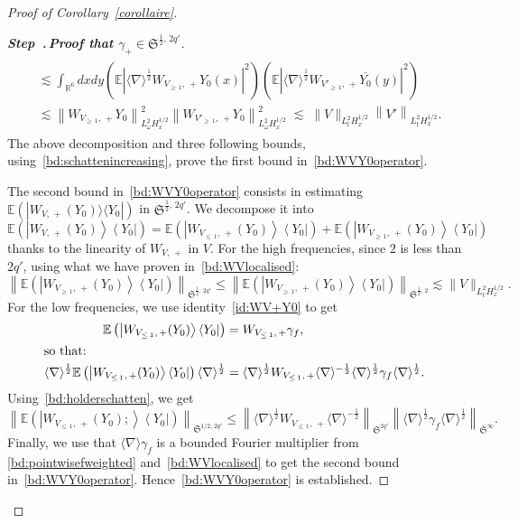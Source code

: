 \documentclass[10pt]{amsart}
\theoremstyle{definition}\newtheorem{defi}[theo]{Definition}\newtheorem{rema}[theo]{Remark}\newtheorem{exam}[theo]{Example}\newtheorem{exem}[theo]{Example}\newtheorem{nota}[theo]{Notation}
\newcommand{\R}{\mathbb{R}}
\newcommand{\E}{\mathbb{E}}
\newcommand{\frkS}{\mathfrak{S}}
\newcommand{\an}[1]{\langle #1 \rangle}
\newcounter{stepcount}
\newenvironment{step}[1]{\refstepcounter{stepcount}\begin{proof}[{\bf{Step~\thestepcount}{.\,\emph{#1}}}]}{\let\qed\relax\end{proof}}
\begin{document}
\begin{proof}[Proof of Corollary~\ref{corollaire}]
\begin{step}{{Proof that $\gamma_+\in \frkS^{\frac 12,\,2q'}$}}
\begin{multline*}
\begin{aligned}
&\lesssim \int_{\R^6}dxdy \left(\E \left|\langle \nabla \rangle^{\frac 12}W_{V_{\geq\,1},\,+}Y_0(x)\right|^2\right) \left(\E \left|\langle \nabla \rangle^{\frac 12}W_{V'_{\geq\,1},\,+}\overline{Y_0}(y)\right|^2 \right)\\
&\lesssim \left\| W_{V_{\geq\,1},\,+}Y_0\right\|_{L^2_\omega H^{1/2}_x}^2\left\| W_{V'_{\geq\,1},\,+}Y_0\right\|_{L^2_\omega H^{1/2}_x}^2 \; \lesssim \; \| V \|_{L^2_tH^{1/2}_x}\left\| V' \right\|_{L^2_tH^{1/2}_x}.
\end{aligned}
\end{multline*}
The above decomposition and three following bounds, using~\eqref{bd:schattenincreasing}, prove the first bound in~\eqref{bd:WVY0operator}.

The second bound in~\eqref{bd:WVY0operator} consists in estimating $\E(|W_{V,\,+}(Y_0)\rangle \langle Y_0|)$ in $\frkS^{\frac12,\,2q'}$. We decompose it into
\[
\E\left(\left|W_{V,\,+}(Y_0)\right\rangle \left\langle Y_0\right|\right) = \E\left(\left|W_{V_{\leq\,1},\,+}(Y_0)\right\rangle \left\langle Y_0\right|\right)+\E\left(\left|W_{V_{\geq\,1},\,+}(Y_0)\right\rangle \left\langle Y_0\right|\right)
\]
thanks to the linearity of $W_{V,\,+}$ in $V$. For the high frequencies, since $2$ is less than $2q'$, using what we have proven in~\eqref{bd:WVlocalised}:
\[
\left\|\E\left(\left|W_{V_{\geq\,1},\,+}(Y_0)\right\rangle \left\langle Y_0\right|\right)\right\|_{\frkS^{\frac12,\,2q'}} \leq \left\|\E\left(\left|W_{V_{\geq\,1},\,+}(Y_0)\right\rangle \left\langle Y_0\right|\right)\right\|_{\frkS^{\frac12,\,2}} \lesssim \|V\|_{L^2_tH^{1/2}_x}.
\]
For the low frequencies, we use identity~\eqref{id:WV+Y0} to get
\begin{align*}
\E\left(\left|W_{V_{\leq\,1},\,+}(Y_0)\right\rangle \left\langle Y_0\right|\right) &= W_{V_{\leq\,1},\,+}\gamma_f,
\\
\intertext{so that:}
\an{\nabla}^{\frac12} \E\left(\left|W_{V_{\leq\,1},\,+}(Y_0)\right\rangle \left\langle Y_0\right|\right) \an{\nabla}^{\frac12} &= \an{\nabla}^{\frac12} W_{V_{\leq\,1},\,+} \an{\nabla}^{-\frac12} \an{\nabla}^{\frac12} \gamma_f \an{\nabla}^{\frac12}.
\end{align*}
Using~\eqref{bd:holderschatten}, we get
\[
\left\|\E\left(\left|W_{V_{\leq\,1},\,+}(Y_0);\right\rangle \left\langle Y_0\right|\right)\right\|_{\frkS^{1/2,\,2q'}}\leq \left\|\an{\nabla}^{\frac12} W_{V_{\leq\,1},\,+} \an{\nabla}^{-\frac12} \right\|_{\frkS^{2q'}} \left\|\an{\nabla}^{\frac12} \gamma_f \an{\nabla}^{\frac12}\right\|_{\frkS^\infty}.
\]
Finally, we use that $\langle \nabla \rangle \gamma_f$ is a bounded Fourier multiplier from \eqref{bd:pointwisefweighted} and~\eqref{bd:WVlocalised} to get the second bound in~\eqref{bd:WVY0operator}. Hence~\eqref{bd:WVY0operator} is established.


\end{step}
\end{proof}
\end{document}
